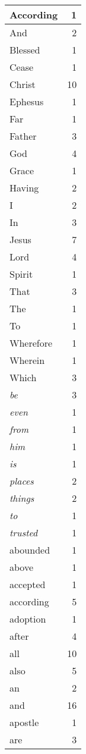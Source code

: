 \begin{center}
\begin{longtable}{l|r}
According & 1\\ \hline 
And & 2\\ \hline 
Blessed & 1\\ \hline 
Cease & 1\\ \hline 
Christ & 10\\ \hline 
Ephesus & 1\\ \hline 
Far & 1\\ \hline 
Father & 3\\ \hline 
God & 4\\ \hline 
Grace & 1\\ \hline 
Having & 2\\ \hline 
I & 2\\ \hline 
In & 3\\ \hline 
Jesus & 7\\ \hline 
Lord & 4\\ \hline 
Spirit & 1\\ \hline 
That & 3\\ \hline 
The & 1\\ \hline 
To & 1\\ \hline 
Wherefore & 1\\ \hline 
Wherein & 1\\ \hline 
Which & 3\\ \hline 
\emph{be} & 3\\ \hline 
\emph{even} & 1\\ \hline 
\emph{from} & 1\\ \hline 
\emph{him} & 1\\ \hline 
\emph{is} & 1\\ \hline 
\emph{places} & 2\\ \hline 
\emph{things} & 2\\ \hline 
\emph{to} & 1\\ \hline 
\emph{trusted} & 1\\ \hline 
abounded & 1\\ \hline 
above & 1\\ \hline 
accepted & 1\\ \hline 
according & 5\\ \hline 
adoption & 1\\ \hline 
after & 4\\ \hline 
all & 10\\ \hline 
also & 5\\ \hline 
an & 2\\ \hline 
and & 16\\ \hline 
apostle & 1\\ \hline 
are & 3\\ \hline 

\end{longtable}
\end{center}
